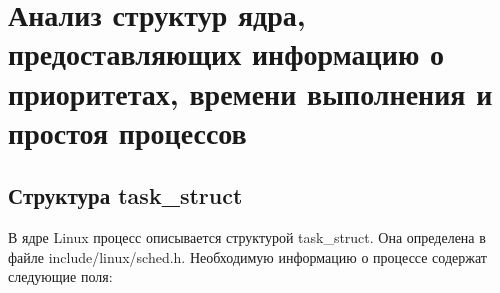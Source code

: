 \section{Анализ структур ядра, предоставляющих информацию о приоритетах, времени выполнения и простоя процессов}


\subsection{Структура task\_struct}

В ядре Linux процесс описывается структурой task\_struct. Она определена в файле include/linux/sched.h. \cite{sched} Необходимую информацию о процессе содержат следующие поля:

